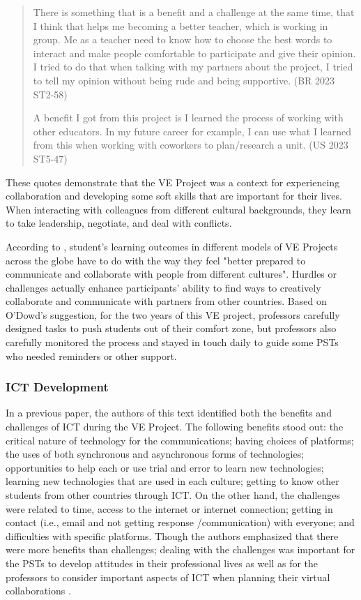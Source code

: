 \begin{quote}
There is something that is a benefit and a challenge at the same time, that I think that helps me becoming a better teacher, which is working in group. Me as a teacher need to know how to choose the best words to interact and make people comfortable to participate and give their opinion. I tried to do that when talking with my partners about the project, I tried to tell my opinion without being rude and being supportive. (BR 2023 ST2-58)
			
A benefit I got from this project is I learned the process of working with other educators. In my future career for example, I can use what I learned from this when working with coworkers to plan/research a unit. (US 2023 ST5-47)
\end{quote}

These quotes demonstrate that the VE Project was a context for
experiencing collaboration and developing some soft skills that are
important for their lives. When interacting with colleagues from
different cultural backgrounds, they learn to take leadership,
negotiate, and deal with conflicts.

According to \textcite{odowd2021virtual}, student’s
learning outcomes in different models of VE Projects across the globe
have to do with the way they feel "better prepared to communicate and
collaborate with people from different cultures". Hurdles or challenges
actually enhance participants' ability to find ways to creatively
collaborate and communicate with partners from other countries. Based on
O'Dowd's suggestion, for the two years of this VE project, professors
carefully designed tasks to push students out of their comfort zone, but
professors also carefully monitored the process and stayed in touch
daily to guide some PSTs who needed reminders or other support.
		
\subsubsection{ICT Development}\label{sub-sub-sec-ictdevelopment}

In a previous paper, the authors of this text identified both the
benefits and challenges of ICT during the VE Project. The following
benefits stood out: the critical nature of technology for the
communications; having choices of platforms; the uses of both
synchronous and asynchronous forms of technologies; opportunities to
help each or use trial and error to learn new technologies; learning new
technologies that are used in each culture; getting to know other
students from other countries through ICT. On the other hand, the
challenges were related to time, access to the internet or internet
connection; getting in contact (i.e., email and not getting
response /communication) with everyone; and difficulties with specific
platforms. Though the authors emphasized that there were more benefits
than challenges; dealing with the challenges was important for the PSTs
to develop attitudes in their professional lives as well as for the
professors to consider important aspects of ICT when planning their
virtual collaborations \cite{calvo2023investigating}.

